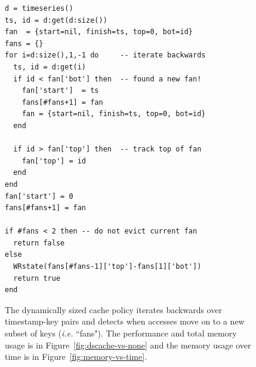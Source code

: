 \begin{figure}[tb]
\footnotesize
\ssp
\begin{verbatim}
d = timeseries()
ts, id = d:get(d:size())
fan  = {start=nil, finish=ts, top=0, bot=id}
fans = {}
for i=d:size(),1,-1 do     -- iterate backwards
  ts, id = d:get(i)
  if id < fan['bot'] then  -- found a new fan!
    fan['start']  = ts
    fans[#fans+1] = fan 
    fan = {start=nil, finish=ts, top=0, bot=id}
  end 

  if id > fan['top'] then  -- track top of fan
    fan['top'] = id 
  end 
end
fan['start'] = 0 
fans[#fans+1] = fan 

if #fans < 2 then -- do not evict current fan
  return false
else
  WRstate(fans[#fans-1]['top']-fans[1]['bot']) 
  return true
end
\end{verbatim}
\dsp
\caption{The dynamically sized cache policy iterates backwards over
timestamp-key pairs and detects when accesses move on to a new subset of keys
({\it i.e.} ``fans"). The performance and total memory usage is in
Figure~\ref{fig:dscache-vs-none} and the memory usage over time is in
Figure~\ref{fig:memory-vs-time}.
\label{src:dyn-cache}}
\end{figure}

%
%
%
%
%
%

